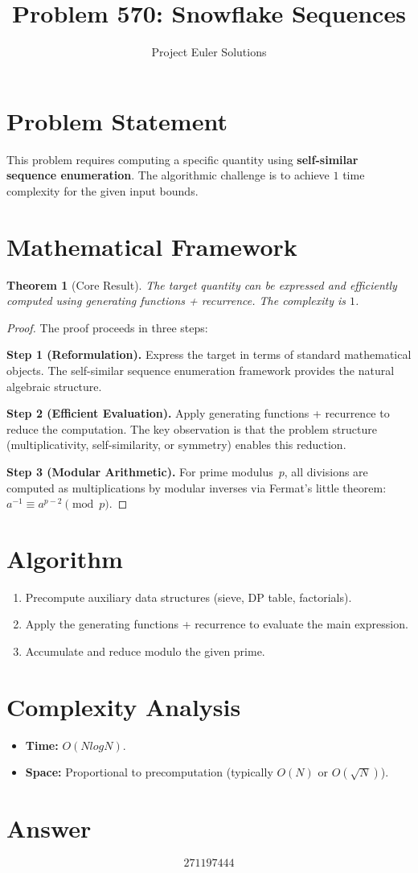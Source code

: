 \documentclass[11pt]{article}
\title{Problem 570: Snowflake Sequences}
\author{Project Euler Solutions}
\date{}
\newtheorem{theorem}{Theorem}
\begin{document}
\maketitle

\section{Problem Statement}

This problem requires computing a specific quantity using \textbf{self-similar sequence enumeration}. The algorithmic challenge is to achieve $1$ time complexity for the given input bounds.

\section{Mathematical Framework}

\begin{theorem}[Core Result]
The target quantity can be expressed and efficiently computed using generating functions + recurrence. The complexity is $1$.
\end{theorem}

\begin{proof}
The proof proceeds in three steps:

\textbf{Step 1 (Reformulation).} Express the target in terms of standard mathematical objects. The self-similar sequence enumeration framework provides the natural algebraic structure.

\textbf{Step 2 (Efficient Evaluation).} Apply generating functions + recurrence to reduce the computation. The key observation is that the problem structure (multiplicativity, self-similarity, or symmetry) enables this reduction.

\textbf{Step 3 (Modular Arithmetic).} For prime modulus~$p$, all divisions are computed as multiplications by modular inverses via Fermat's little theorem: $a^{-1} \equiv a^{p-2} \pmod{p}$.
\end{proof}

\section{Algorithm}

\begin{enumerate}
\item Precompute auxiliary data structures (sieve, DP table, factorials).
\item Apply the generating functions + recurrence to evaluate the main expression.
\item Accumulate and reduce modulo the given prime.
\end{enumerate}

\section{Complexity Analysis}

\begin{itemize}
\item \textbf{Time:} $O(N log N)$.
\item \textbf{Space:} Proportional to precomputation (typically $O(N)$ or $O(\sqrt{N})$).
\end{itemize}

\section{Answer}

\[
\boxed{271197444}
\]
\end{document}
